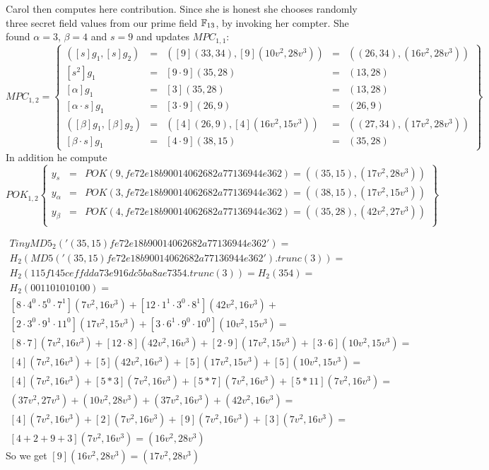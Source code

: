 \begin{example}
Carol then computes here contribution. Since she is honest she chooses randomly three secret field values from our prime field $\mathbb{F}_{13}$, by invoking her compter. She found $\alpha = 3$, $\beta=4$ and $s= 9$ and updates $MPC_{1,1}$:  
$$
MPC_{1,2}= \left\{
\begin{array}{lclcl}
([s]g_1, [s]g_2) &=& ([9](33,34),[9](10v^2,28v^3)) &=&  ((26,34),(16v^2,28v^3))\\ 
{}[s^2] g_1 &=& [9\cdot 9](35,28) &=& (13,28)\\
{}[\alpha]g_1 &=& [3](35,28) &=& (13,28) \\ 
{}[\alpha\cdot s]g_1 &=& [3\cdot 9](26,9) &=& (26,9)\\ 
([\beta]g_1,[\beta]g_2) &=& ([4](26,9),[4](16v^2,15v^3)) &=& ((27,34),(17v^2,28v^3))\\ 
{}[\beta \cdot s]g_1 &=& [4\cdot 9](38,15) &=& (35,28)
\end{array}
\right\}
$$
In addition he compute 
$$
POK_{1,2} \left\{
\begin{array}{lcl}
y_{s} &=& POK(9, fe72e18b90014062682a77136944e362) = ((35,15),(17v^2 , 28v^3))\\
y_{\alpha} &=& POK(3, fe72e18b90014062682a77136944e362) = ((38,15),(17v^2 , 15v^3 ))\\ 
y_{\beta} &=& POK(4, fe72e18b90014062682a77136944e362) = ((35,28),(42v^2 , 27v^3 ))\\
\end{array}
\right\}
$$

\begin{align*}
TinyMD5_{2}('(35,15)fe72e18b90014062682a77136944e362') =\\ H_2(MD5('(35,15)fe72e18b90014062682a77136944e362').trunc(3))=\\ H_2(115f145ceffdda73e916dc5ba8ae7354.trunc(3))= H_2(354) = \\
H_2(001 101 010 100)=\\
[8\cdot 4^{0}\cdot 5^{0}\cdot 7^{1}](7v^2 , 16v^3)+
[12\cdot 1^{1}\cdot 3^{0}\cdot 8^{1}](42v^2 , 16v^3 )+\\
[2\cdot 3^{0}\cdot 9^{1}\cdot 11^{0}](17v^2 , 15v^3 ) +
[3\cdot 6^{1}\cdot 9^{0}\cdot 10^{0}](10v^2 , 15v^3 )= \\
[8\cdot 7](7v^2 , 16v^3)+
[12\cdot 8](42v^2 , 16v^3 )+
[2\cdot 9](17v^2 , 15v^3 ) +
[3\cdot 6](10v^2 , 15v^3 )= \\
[4](7v^2 , 16v^3)+
[5](42v^2 , 16v^3 )+
[5](17v^2 , 15v^3 ) +
[5](10v^2 , 15v^3 )= \\
[4](7v^2 , 16v^3)+
[5*3](7v^2 , 16v^3 )+
[5*7](7v^2 , 16v^3 ) +
[5*11](7v^2 , 16v^3 )=\\
(37v^2 , 27v^3)+
(10v^2 , 28v^3 )+
(37v^2 , 16v^3 ) +
(42v^2 , 16v^3 )=\\
[4](7v^2 , 16v^3)+
[2](7v^2 , 16v^3 )+
[9](7v^2 , 16v^3 ) +
[3](7v^2 , 16v^3 )=\\
[4+2+9+3](7v^2 , 16v^3)=
(16v^2 , 28v^3 )
\end{align*}
So we get $[9](16v^2 , 28v^3 )= (17v^2 , 28v^3 )$


\end{example}
